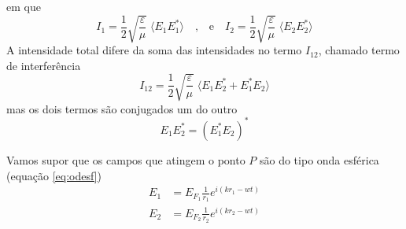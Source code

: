 \documentclass[a4paper,12pt]{article}
\begin{document}
em que 
\begin{equation}
	\label{eq:10} I_1 =\frac{1}{2}\sqrt{\frac{ \varepsilon}{\mu}} \;  \langle E_{1} E^*_{1} \rangle \quad \text{,} \quad \text{e} \quad  I_2 =\frac{1}{2}\sqrt{\frac{ \varepsilon}{\mu}} \; \langle E_2 E^*_2 \rangle
\end{equation}
A intensidade total difere da soma das intensidades no termo $I_{12} $, chamado termo de interferência 
\begin{equation}
	\label{eq:11} I_{12} =\frac{1}{2}\sqrt{\frac{ \varepsilon}{\mu}} \; \langle E_1 E^*_2 + E^*_1 E_2 \rangle 
\end{equation}
mas os dois termos são conjugados um do outro 
\begin{equation}
	\label{eq:12} E_1 E^*_2 = (E^*_1 E_2)^* 
\end{equation}

Vamos supor que os campos que atingem o ponto $P$ são do tipo onda esférica (equação \ref{eq:odesf}) 
\begin{align}
	E_1 &= E_{F_1} \frac{1}{r_1} e^{ i (k r_1 -wt )} \label{eq:odesf}\\
	E_2 &= E_{F_2} \frac{1}{r_2} e^{ i (k r_2 -wt )} \label{eq:odesf1} 
\end{align}
\end{document}
